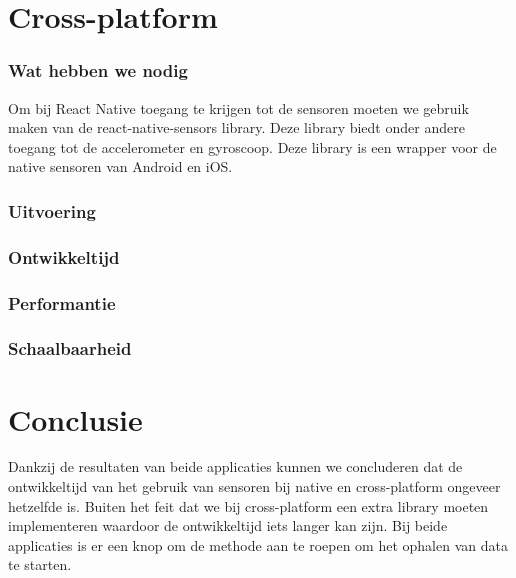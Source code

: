 


\section{Cross-platform}
\subsubsection{Wat hebben we nodig}
Om bij React Native toegang te krijgen tot de sensoren moeten we gebruik maken van de react-native-sensors library.
Deze library biedt onder andere toegang tot de accelerometer en gyroscoop. Deze library is een wrapper voor de
native sensoren van Android en iOS. 

\subsubsection{Uitvoering}



\subsubsection{Ontwikkeltijd}



\subsubsection{Performantie}



\subsubsection{Schaalbaarheid}




\section{Conclusie}
Dankzij de resultaten van beide applicaties kunnen we concluderen dat de ontwikkeltijd van het gebruik van sensoren
bij native en cross-platform ongeveer hetzelfde is. Buiten het feit dat we bij cross-platform een extra library moeten
implementeren waardoor de ontwikkeltijd iets langer kan zijn. Bij beide applicaties is er een knop om de methode aan 
te roepen om het ophalen van data te starten.

